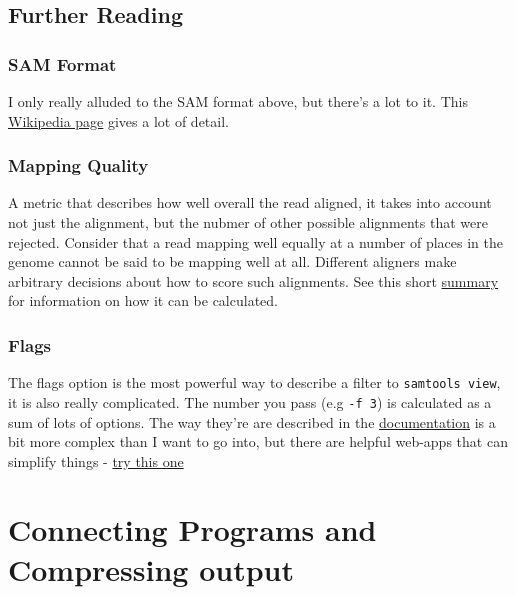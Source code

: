 \documentclass[]{book}
\begin{document}
\hypertarget{further-reading-1}{%
\section{Further Reading}\label{further-reading-1}}

\hypertarget{sam-format-1}{%
\subsection{SAM Format}\label{sam-format-1}}

I only really alluded to the SAM format above, but there's a lot to it. This \href{https://en.wikipedia.org/wiki/SAM_(file_format)}{Wikipedia page} gives a lot of detail.

\hypertarget{mapping-quality}{%
\subsection{Mapping Quality}\label{mapping-quality}}

A metric that describes how well overall the read aligned, it takes into account not just the alignment, but the nubmer of other possible alignments that were rejected. Consider that a read mapping well equally at a number of places in the genome cannot be said to be mapping well at all. Different aligners make arbitrary decisions about how to score such alignments. See this short \href{https://genome.sph.umich.edu/wiki/Mapping_Quality_Scores}{summary} for information on how it can be calculated.

\hypertarget{flags}{%
\subsection{Flags}\label{flags}}

The flags option is the most powerful way to describe a filter to \texttt{samtools\ view}, it is also really complicated. The number you pass (e.g \texttt{-f\ 3}) is calculated as a sum of lots of options. The way they're are described in the \href{https://en.wikipedia.org/wiki/SAM_(file_format)\#Bitwise_Flags}{documentation} is a bit more complex than I want to go into, but there are helpful web-apps that can simplify things - \href{https://broadinstitute.github.io/picard/explain-flags.html}{try this one}

\hypertarget{connecting-programs-and-compressing-output}{%
\chapter{Connecting Programs and Compressing output}\label{connecting-programs-and-compressing-output}}
\end{document}
